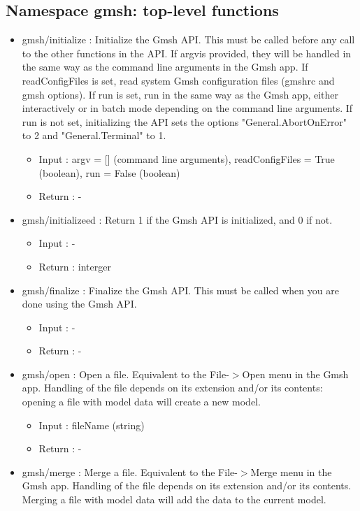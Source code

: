 \documentclass[dvipdfmx, 9pt, a4paper]{article}
\numberwithin{equation}{section}
\begin{document}
\subsection{Namespace gmsh: top-level functions}
\begin{itemize}
\item gmsh/initialize : Initialize the Gmsh API. This must be called before any call to the other functions in the API. If argvis provided, they will be handled in the same way as the command line arguments in the Gmsh app. If readConfigFiles is set, read system Gmsh configuration files (gmshrc and gmsh options). If run is set, run in the same way as the Gmsh app, either interactively or in batch mode depending on the command line arguments. If run is not set, initializing the API sets the options "General.AbortOnError" to 2 and "General.Terminal" to 1.
\begin{itemize}
\item Input : argv = [] (command line arguments), readConfigFiles = True (boolean), run = False (boolean)
\item Return : -
\end{itemize}
\item gmsh/initializeed : Return 1 if the Gmsh API is initialized, and 0 if not.
\begin{itemize}
\item Input : -
\item Return : interger
\end{itemize}
\item gmsh/finalize : Finalize the Gmsh API. This must be called when you are done using the Gmsh API.
\begin{itemize}
\item Input : -
\item Return : -
\end{itemize}
\item gmsh/open : Open a file. Equivalent to the File-$>$Open menu in the Gmsh app. Handling of the file depends on its extension and/or its contents: opening a file with model data will create a new model.
\begin{itemize}
\item Input : fileName (string)
\item Return : -
\end{itemize}
\item gmsh/merge : Merge a file. Equivalent to the File-$>$Merge menu in the Gmsh app. Handling of the file depends on its extension and/or its contents. Merging a file with model data will add the data to the current model.

\end{itemize}
\end{document}
